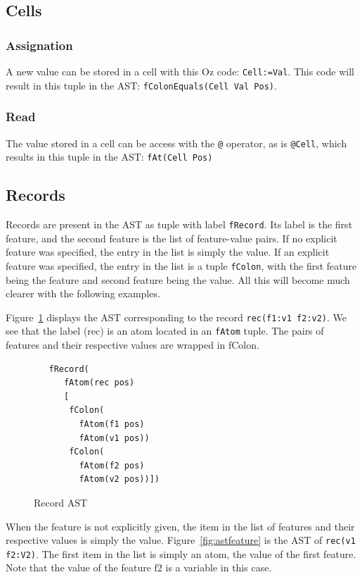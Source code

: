 \documentclass[a4paper]{memoir}
\begin{document}
\subsection{Cells}\label{sec:input:cells}
\subsubsection{Assignation}
A new value can be stored in a cell with this Oz code: \lstinline!Cell:=Val!. This code will result in 
this tuple in the AST: \lstinline!fColonEquals(Cell Val Pos)!. 
\subsubsection{Read}
The value stored in a cell can be access with the \lstinline!@! operator, as is
\lstinline!@Cell!, which results in this tuple in the AST: 
\lstinline!fAt(Cell Pos)!
\subsection{Records}\label{sec:input:records}

Records are present in the AST as tuple with label \lstinline!fRecord!. Its
label is the first feature, and the second feature is the list of feature-value
pairs. If no explicit feature was specified, the entry in the list is simply the value.
If an explicit feature was specified, the entry in the list is a tuple \lstinline!fColon!, with the
first feature being the feature and second feature being the value. All this
will become much clearer with the following examples.

Figure~\ref{fig:recordsast} displays the AST corresponding to the record \lstinline!rec(f1:v1 f2:v2)!. We see that the label (rec) is an atom located in an \lstinline!fAtom! tuple. The pairs of features and their respective values are wrapped in fColon.

\begin{figure}[h]
\begin{lstlisting}
   fRecord(
      fAtom(rec pos)
      [
       fColon(
         fAtom(f1 pos)
         fAtom(v1 pos))
       fColon(
         fAtom(f2 pos)
         fAtom(v2 pos))])
\end{lstlisting}
\caption{Record AST}
\label{fig:recordsast}
\end{figure}


When the feature is not explicitly given, the item in the list of features and their respective values is simply the value. Figure~\ref{fig:astfeature} is the AST of \lstinline!rec(v1 f2:V2)!. The first item in the list is simply an atom, the value of the first feature. Note that the value of the feature f2 is a variable in this case.
\end{document}

